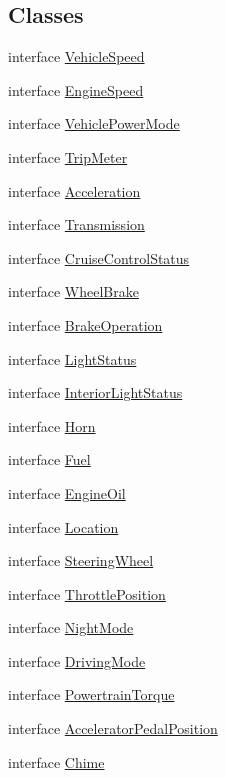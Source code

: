 \subsection*{Classes}
\begin{DoxyCompactItemize}
\item 
interface \hyperlink{interfaceVehicleSpeed}{Vehicle\+Speed}
\item 
interface \hyperlink{interfaceEngineSpeed}{Engine\+Speed}
\item 
interface \hyperlink{interfaceVehiclePowerMode}{Vehicle\+Power\+Mode}
\item 
interface \hyperlink{interfaceTripMeter}{Trip\+Meter}
\item 
interface \hyperlink{interfaceAcceleration}{Acceleration}
\item 
interface \hyperlink{interfaceTransmission}{Transmission}
\item 
interface \hyperlink{interfaceCruiseControlStatus}{Cruise\+Control\+Status}
\item 
interface \hyperlink{interfaceWheelBrake}{Wheel\+Brake}
\item 
interface \hyperlink{interfaceBrakeOperation}{Brake\+Operation}
\item 
interface \hyperlink{interfaceLightStatus}{Light\+Status}
\item 
interface \hyperlink{interfaceInteriorLightStatus}{Interior\+Light\+Status}
\item 
interface \hyperlink{interfaceHorn}{Horn}
\item 
interface \hyperlink{interfaceFuel}{Fuel}
\item 
interface \hyperlink{interfaceEngineOil}{Engine\+Oil}
\item 
interface \hyperlink{interfaceLocation}{Location}
\item 
interface \hyperlink{interfaceSteeringWheel}{Steering\+Wheel}
\item 
interface \hyperlink{interfaceThrottlePosition}{Throttle\+Position}
\item 
interface \hyperlink{interfaceNightMode}{Night\+Mode}
\item 
interface \hyperlink{interfaceDrivingMode}{Driving\+Mode}
\item 
interface \hyperlink{interfacePowertrainTorque}{Powertrain\+Torque}
\item 
interface \hyperlink{interfaceAcceleratorPedalPosition}{Accelerator\+Pedal\+Position}
\item 
interface \hyperlink{interfaceChime}{Chime}
\item 

\end{DoxyCompactItemize}
